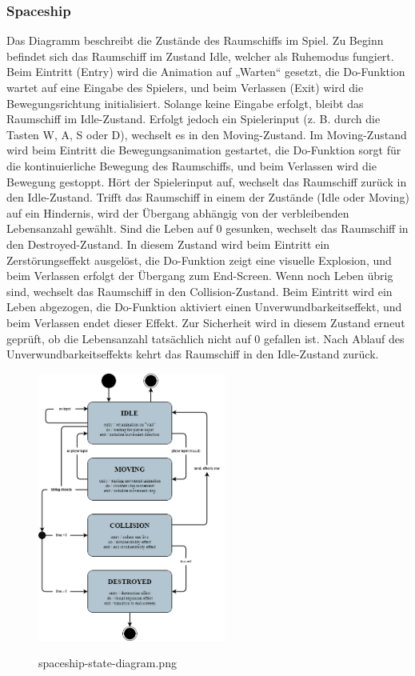 \documentclass[10pt]{article}
\begin{document}
\subsubsection{Spaceship}
Das Diagramm beschreibt die Zustände des Raumschiffs im Spiel.
Zu Beginn befindet sich das Raumschiff im Zustand Idle, welcher als Ruhemodus fungiert. Beim Eintritt (Entry) wird die Animation auf „Warten“ gesetzt, die Do-Funktion wartet auf eine Eingabe des Spielers, und beim Verlassen (Exit) wird die Bewegungsrichtung initialisiert. Solange keine Eingabe erfolgt, bleibt das Raumschiff im Idle-Zustand. Erfolgt jedoch ein Spielerinput (z. B. durch die Tasten W, A, S oder D), wechselt es in den Moving-Zustand.
Im Moving-Zustand wird beim Eintritt die Bewegungsanimation gestartet, die Do-Funktion sorgt für die kontinuierliche Bewegung des Raumschiffs, und beim Verlassen wird die Bewegung gestoppt. Hört der Spielerinput auf, wechselt das Raumschiff zurück in den Idle-Zustand.
Trifft das Raumschiff in einem der Zustände (Idle oder Moving) auf ein Hindernis, wird der Übergang abhängig von der verbleibenden Lebensanzahl gewählt. Sind die Leben auf 0 gesunken, wechselt das Raumschiff in den Destroyed-Zustand. In diesem Zustand wird beim Eintritt ein Zerstörungseffekt ausgelöst, die Do-Funktion zeigt eine visuelle Explosion, und beim Verlassen erfolgt der Übergang zum End-Screen.
Wenn noch Leben übrig sind, wechselt das Raumschiff in den Collision-Zustand. Beim Eintritt wird ein Leben abgezogen, die Do-Funktion aktiviert einen Unverwundbarkeitseffekt, und beim Verlassen endet dieser Effekt. Zur Sicherheit wird in diesem Zustand erneut geprüft, ob die Lebensanzahl tatsächlich nicht auf 0 gefallen ist. Nach Ablauf des Unverwundbarkeitseffekts kehrt das Raumschiff in den Idle-Zustand zurück.\\
\begin{figure}
	\centering
	\includegraphics[width=0.55\textwidth]{../../../images/Pflichtenheft_Assets/uml-state-diagram/spaceship-state-diagram.png}\\
	\caption{spaceship-state-diagram.png}
\end{figure}
\end{document}

